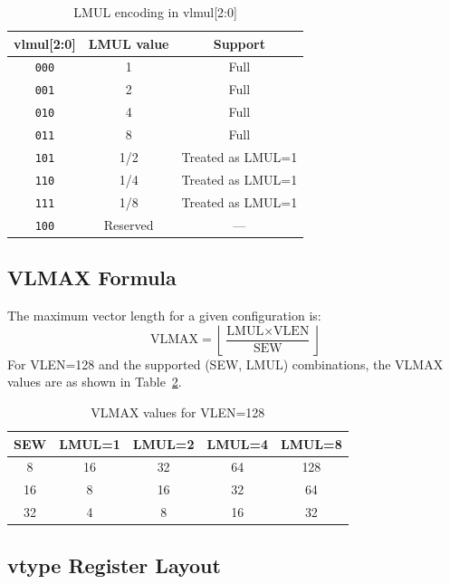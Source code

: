\begin{table}[H]
  \centering
  \caption{LMUL encoding in vlmul[2:0]}
  \label{tab:lmul-encoding}
  \begin{tabular}{@{}ccc@{}}
    \toprule
    \textbf{vlmul[2:0]} & \textbf{LMUL value} & \textbf{Support} \\
    \midrule
    \texttt{000} & 1   & Full \\
    \texttt{001} & 2   & Full \\
    \texttt{010} & 4   & Full \\
    \texttt{011} & 8   & Full \\
    \texttt{101} & 1/2 & Treated as LMUL=1 \\
    \texttt{110} & 1/4 & Treated as LMUL=1 \\
    \texttt{111} & 1/8 & Treated as LMUL=1 \\
    \texttt{100} & Reserved & --- \\
    \bottomrule
  \end{tabular}
\end{table}

\subsection{VLMAX Formula}

The maximum vector length for a given configuration is:
\begin{equation}
  \text{VLMAX} = \left\lfloor \frac{\text{LMUL} \times \text{VLEN}}{\text{SEW}} \right\rfloor
  \label{eq:vlmax-spec}
\end{equation}
For VLEN=128 and the supported (SEW, LMUL) combinations, the VLMAX values are as
shown in Table~\ref{tab:vlmax}.

\begin{table}[H]
  \centering
  \caption{VLMAX values for VLEN=128}
  \label{tab:vlmax}
  \begin{tabular}{@{}ccccc@{}}
    \toprule
    \textbf{SEW} & \textbf{LMUL=1} & \textbf{LMUL=2} & \textbf{LMUL=4} & \textbf{LMUL=8} \\
    \midrule
    8  & 16 & 32 & 64  & 128 \\
    16 & 8  & 16 & 32  & 64  \\
    32 & 4  & 8  & 16  & 32  \\
    \bottomrule
  \end{tabular}
\end{table}

\subsection{vtype Register Layout}

